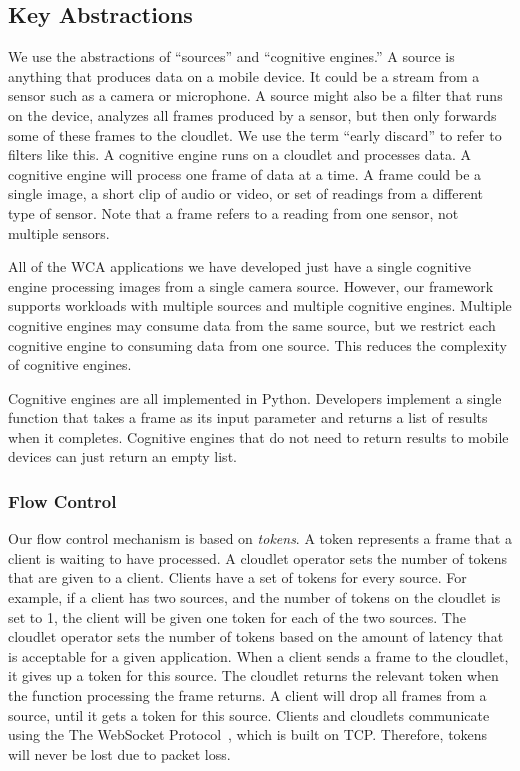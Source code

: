 \subsection{Key Abstractions}

We use the abstractions of ``sources'' and ``cognitive engines.'' A source is
anything that produces data on a mobile device. It could be a stream from a
sensor such as a camera or microphone. A source might also be a filter that runs
on the device, analyzes all frames produced by a sensor, but then only forwards
some of these frames to the
cloudlet. We use the term ``early discard'' to refer to filters like
this. A cognitive engine runs on a cloudlet and processes data. A cognitive
engine will process one frame of data at a time.
A frame could be a single image, a short clip of audio or video, or set of
readings from a different type of sensor.
Note that a frame refers to a reading from one sensor, not multiple sensors.

All of the WCA applications we have developed just
have a single cognitive engine processing images from a single camera source.
However, our framework supports workloads with multiple sources and multiple
cognitive engines. Multiple cognitive engines may consume data from the same
source, but we restrict each cognitive engine to consuming data from one source.
This reduces the complexity of cognitive engines.

Cognitive engines are all implemented in Python. Developers implement a single
function that takes a frame as its input parameter and returns a list of
results when it completes. Cognitive engines that do not need to return results
to mobile devices can just return an empty list.

\subsubsection{Flow Control}

Our flow control mechanism is based on \emph{tokens}.
A token represents a frame that a client is waiting to have processed.
A cloudlet operator sets the number of tokens that are given to a client.
Clients have a set of tokens for every source.
For example, if a client has two sources, and the number of tokens on the
cloudlet is set to 1, the client will be given one token for each of the two
sources.
The cloudlet operator sets the number of tokens based on the amount of latency
that is acceptable for a given application.
When a client sends a frame to the cloudlet, it gives up a token for this
source.
The cloudlet returns the relevant token when the function processing the frame
returns.
A client will drop all frames from a source, until it gets a token for this
source.
Clients and cloudlets communicate using the The WebSocket
Protocol~\cite{wsocket}, which is built on TCP.
Therefore, tokens will never be lost due to packet loss.

